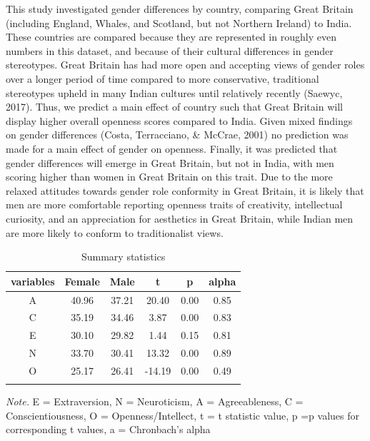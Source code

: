 \documentclass[
  english,
  man, fleqn, noextraspace]{apa6}
\begin{document}
This study investigated gender differences by country, comparing Great Britain (including England, Whales, and Scotland, but not Northern Ireland) to India. These countries are compared because they are represented in roughly even numbers in this dataset, and because of their cultural differences in gender stereotypes. Great Britain has had more open and accepting views of gender roles over a longer period of time compared to more conservative, traditional stereotypes upheld in many Indian cultures until relatively recently (Saewyc, 2017). Thus, we predict a main effect of country such that Great Britain will display higher overall openness scores compared to India. Given mixed findings on gender differences (Costa, Terracciano, \& McCrae, 2001) no prediction was made for a main effect of gender on openness. Finally, it was predicted that gender differences will emerge in Great Britain, but not in India, with men scoring higher than women in Great Britain on this trait. Due to the more relaxed attitudes towards gender role conformity in Great Britain, it is likely that men are more comfortable reporting openness traits of creativity, intellectual curiosity, and an appreciation for aesthetics in Great Britain, while Indian men are more likely to conform to traditionalist views.

\begin{table}[tbp]

\begin{center}
\begin{threeparttable}

\caption{\label{tab:descriptiveTable}Summary statistics}

\begin{tabular}{cccccc}
\toprule
variables & \multicolumn{1}{c}{Female} & \multicolumn{1}{c}{Male} & \multicolumn{1}{c}{t} & \multicolumn{1}{c}{p} & \multicolumn{1}{c}{alpha}\\
\midrule
A & 40.96 & 37.21 & 20.40 & 0.00 & 0.85\\
C & 35.19 & 34.46 & 3.87 & 0.00 & 0.83\\
E & 30.10 & 29.82 & 1.44 & 0.15 & 0.81\\
N & 33.70 & 30.41 & 13.32 & 0.00 & 0.89\\
O & 25.17 & 26.41 & -14.19 & 0.00 & 0.49\\
\bottomrule
\addlinespace
\end{tabular}

\begin{tablenotes}[para]
\normalsize{\textit{Note.} E = Extraversion, N = Neuroticism, A = Agreeableness, C = Conscientiousness, O = Openness/Intellect, t = t statistic value, p =p values for corresponding t values, a = Chronbach's alpha}
\end{tablenotes}

\end{threeparttable}
\end{center}

\end{table}
\end{document}
